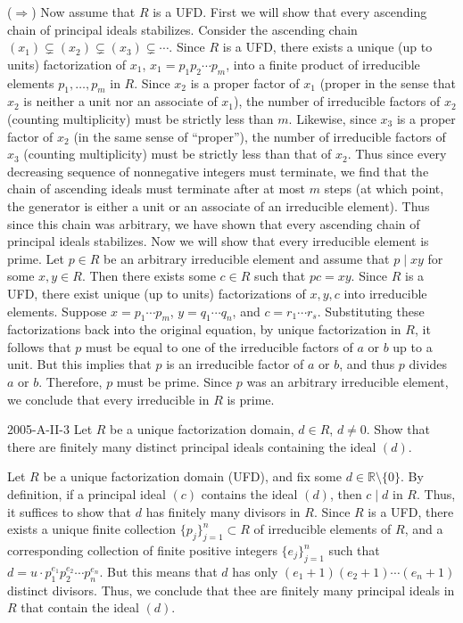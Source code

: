 \documentclass{article}
\begin{document}
	($\Longrightarrow$) Now assume that $R$ is a UFD. First we will show that every ascending chain of principal ideals stabilizes. Consider the ascending chain $(x_{1}) \subsetneq (x_{2}) \subsetneq (x_{3}) \subsetneq \dotsm$. Since $R$ is a UFD, there exists a unique (up to units) factorization of $x_{1}$, $x_{1} = p_{1}p_{2}\dotsm p_{m}$, into a finite product of irreducible elements $p_{1}, \ldots, p_{m}$ in $R$. Since $x_{2}$ is a proper factor of $x_{1}$ (proper in the sense that $x_{2}$ is neither a unit nor an associate of $x_{1}$), the number of irreducible factors of $x_{2}$ (counting multiplicity) must be strictly less than $m$. Likewise, since $x_{3}$ is a proper factor of $x_{2}$ (in the same sense of ``proper''), the number of irreducible factors of $x_{3}$ (counting multiplicity) must be strictly less than that of $x_{2}$. Thus since every decreasing sequence of nonnegative integers must terminate, we find that the chain of ascending ideals must terminate after at most $m$ steps (at which point, the generator is either a unit or an associate of an irreducible element). Thus since this chain was arbitrary, we have shown that every ascending chain of principal ideals stabilizes. Now we will show that every irreducible element is prime. Let $p \in R$ be an arbitrary irreducible element and assume that $p \mid xy$ for some $x, y \in R$. Then there exists some $c \in R$ such that $pc = xy$. Since $R$ is a UFD, there exist unique (up to units) factorizations of $x, y, c$ into irreducible elements. Suppose $x = p_{1}\dotsm p_{m}$, $y = q_{1}\dotsm q_{n}$, and $c = r_{1}\dotsm r_{s}$. Substituting these factorizations back into the original equation, by unique factorization in $R$, it follows that $p$ must be equal to one of the irreducible factors of $a$ or $b$ up to a unit. But this implies that $p$ is an irreducible factor of $a$ or $b$, and thus $p$ divides $a$ or $b$. Therefore, $p$ must be prime. Since $p$ was an arbitrary irreducible element, we conclude that every irreducible in $R$ is prime. 
	
	\begin{prb}{2005-A-II-3}
		Let $R$ be a unique factorization domain, $d \in R$, $d \neq 0$. Show that there are finitely many distinct principal ideals containing the ideal $(d)$. 
	\end{prb}
	Let $R$ be a unique factorization domain (UFD), and fix some $d \in \mathbb{R} \setminus \{0\}$. By definition, if a principal ideal $(c)$ contains the ideal $(d)$, then $c \mid d$ in $R$. Thus, it suffices to show that $d$ has finitely many divisors in $R$. Since $R$ is a UFD, there exists a unique finite collection $\{p_{j}\}_{j = 1}^{n}\subset R$ of irreducible elements of $R$, and a corresponding collection of finite positive integers $\{e_{j}\}_{j = 1}^{n}$ such that $d = u \cdot p_{1}^{e_{1}}p_{2}^{e_{2}}\dotsm p_{n}^{e_{n}}$. But this means that $d$ has only $(e_{1} + 1)(e_{2} + 1)\dotsm(e_{n} + 1)$ distinct divisors. Thus, we conclude that thee are finitely many principal ideals in $R$ that contain the ideal $(d)$. 
	
\end{document}
